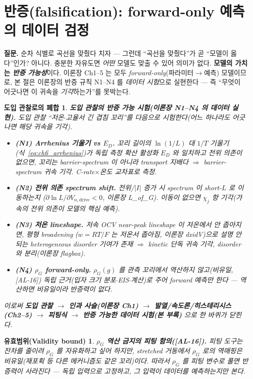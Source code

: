 \documentclass[11pt,a4paper]{article}
\newtheorem*{boundbox}{유효범위(Validity bound)}
\newtheorem*{loopbox}{도입 관찰로의 폐합}
\newcommand{\drive}{\mathrm{drive}}
\newcommand{\AL}[1]{\textsf{[AL-#1]}}
\begin{document}
\section{반증(falsification): forward-only 예측의 데이터 검정}\label{sec:ch6_falsify}
\textbf{질문.} 순차 식별로 곡선을 맞췄다 치자 — 그런데 ``곡선을 맞췄다''가 곧 ``모델이 옳다''인가? 아니다. 충분한
자유도면 \emph{어떤} 모델도 맞출 수 있어 의미가 없다. \textbf{모델의 가치는 \emph{반증 가능성}}이다. 이론장 Ch1--5
는 모두 \emph{forward-only}(파라미터$\to$예측) 모델이므로, 본 절은 이론장의 반증 규칙 N1--N4 를 \emph{데이터 시험}으로
실현한다 — 즉 ``무엇이 어긋나면 이 귀속을 \emph{기각}하는가''를 못박는다.
\begin{loopbox}
\textbf{도입 관찰의 반증 가능 시험(이론장 N1--N4 의 데이터 실현).} 도입 관찰 ``저온$\cdot$고율서 긴 겹침 꼬리''를
다음으로 시험한다(어느 하나라도 어긋나면 해당 귀속을 \emph{기각}).
\begin{itemize}[leftmargin=1.6em]
\item \textbf{(N1) Arrhenius 기울기 vs $E_D$.} 꼬리 길이의 $\ln(1/L)$ 대 $1/T$ 기울기(식~\eqref{eq:ch6_arrhenius})가
  독립 측정 확산 활성화 $E_D$ 와 \emph{일치}하고 \emph{전위 의존이 없으면}, 꼬리는 barrier-spectrum 이 아니라
  transport 지배다 $\Rightarrow$ barrier-spectrum 귀속 \emph{기각}. C-rate$\times$온도 교차표로 측정.
\item \textbf{(N2) 전위 의존 spectrum shift.} 전위/$|I|$ 증가 시 spectrum 이 short-$L$ 로 이동하는지
  ($\partial\ln L/\partial V_{n,\drive}<0$, 이론장 L\_of\_G). 이동이 없으면 $\chi_j$ 항 \emph{기각}(가속의 전위
  의존이 모델의 핵심 예측).
\item \textbf{(N3) 저온 lineshape.} 저속 OCV near-peak lineshape 이 저온에서 \emph{안 좁아지면}, 평형 broadening
  ($w=RT/F$ 는 저온서 좁아짐, 이론장 dxidV)으로 설명 안 되는 heterogeneous disorder 기여가 존재 $\Rightarrow$
  kinetic 단독 귀속 기각, disorder 와 분리(이론장 flagbox).
\item \textbf{(N4) $\rho_G$ forward-only.} $\rho_G(g)$ 를 관측 꼬리에서 \emph{역산하지 않고}(비유일, \AL{16})
  독립 근거(입자 크기 분포$\cdot$EIS$\cdot$계산)로 주어 forward 예측만 한다 — 역산하면 비유일이라 반증력이 없다.
\end{itemize}
이로써 \textbf{도입 관찰 $\to$ 인과 사슬(이론장 Ch1) $\to$ 발열/속도론/히스테리시스(Ch2--5) $\to$ 피팅식 $\to$ 반증
가능한 데이터 시험(본 부록)} 으로 한 바퀴가 닫힌다.
\end{loopbox}
\begin{boundbox}
\textbf{$\rho_G$ 역산 금지의 피팅 함의(\AL{16}).} 피팅 도구는 잔차를 줄이려 $\rho_G$ 를 자유화하고 싶어 하지만,
stretched 거동에서 $\rho_G$ 로의 역매핑은 비유일(재포획 등 다른 메커니즘도 같은 꼬리)이다. 따라서 $\rho_G$ 를
피팅 변수로 풀면 반증력이 사라진다 — 독립 입력으로 고정하고, 그 입력이 데이터를 \emph{예측}하는지만 본다.
\end{boundbox}
\end{document}
